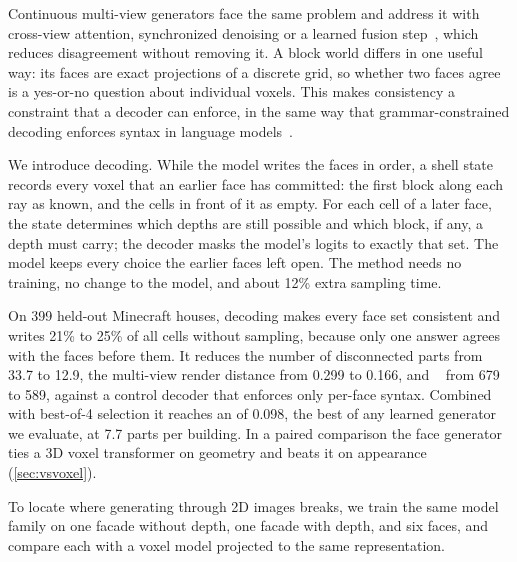 Continuous multi-view generators face the same problem and address it with cross-view attention,
synchronized denoising or a learned fusion step~\citep{shi2024mvdream,liu2024syncdreamer,wang2024mvdd},
which reduces disagreement without removing it. A block world differs in one useful way: its faces are
exact projections of a discrete grid, so whether two faces agree is a yes-or-no question about
individual voxels. This makes consistency a constraint that a decoder can enforce, in the same way
that grammar-constrained decoding enforces syntax in language models~\citep{scholak2021picard,geng2023grammar,willard2023outlines}.

We introduce \cfd{} decoding. While the model writes the faces in order, a shell state records every
voxel that an earlier face has committed: the first block along each ray as known, and the cells in
front of it as empty. For each cell of a later face, the state determines which depths are still
possible and which block, if any, a depth must carry; the decoder masks the model's logits to exactly
that set. The model keeps every choice the earlier faces left open. The method needs no training, no
change to the model, and about 12\% extra sampling time.

On 399 held-out Minecraft houses, \cfd{} decoding makes every face set consistent and writes 21\% to
25\% of all cells without sampling, because only one answer agrees with the faces before them. It
reduces the number of disconnected parts from 33.7 to 12.9, the multi-view render distance
\mvkid{} from 0.299 to 0.166, and \blockscore{}~\citep{anonymous2027blindness} from 679 to 589,
against a control decoder that enforces only per-face syntax. Combined with best-of-4 selection it
reaches an \mvkid{} of 0.098, the best of any learned generator we evaluate, at 7.7 parts per
building. In a paired comparison the face generator ties a 3D voxel transformer on geometry and beats it
on appearance (\cref{sec:vsvoxel}).

To locate where generating through 2D images breaks, we train the same model family on one facade
without depth, one facade with depth, and six faces, and compare each with a voxel model projected to
the same representation. 

